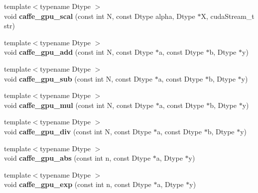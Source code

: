 \begin{DoxyCompactItemize}
\item 
{\footnotesize template$<$typename Dtype $>$ }\\void {\bfseries caffe\+\_\+gpu\+\_\+scal} (const int N, const Dtype alpha, Dtype $\ast$X, cuda\+Stream\+\_\+t str)\hypertarget{namespacecaffe_ace9fb7f8188d8f2bd58735c7617325ea}{}\label{namespacecaffe_ace9fb7f8188d8f2bd58735c7617325ea}

\item 
{\footnotesize template$<$typename Dtype $>$ }\\void {\bfseries caffe\+\_\+gpu\+\_\+add} (const int N, const Dtype $\ast$a, const Dtype $\ast$b, Dtype $\ast$y)\hypertarget{namespacecaffe_a0c7219c875e46b5f11e345f34209f369}{}\label{namespacecaffe_a0c7219c875e46b5f11e345f34209f369}

\item 
{\footnotesize template$<$typename Dtype $>$ }\\void {\bfseries caffe\+\_\+gpu\+\_\+sub} (const int N, const Dtype $\ast$a, const Dtype $\ast$b, Dtype $\ast$y)\hypertarget{namespacecaffe_a3f151ddcec1be108851341de83d31a1b}{}\label{namespacecaffe_a3f151ddcec1be108851341de83d31a1b}

\item 
{\footnotesize template$<$typename Dtype $>$ }\\void {\bfseries caffe\+\_\+gpu\+\_\+mul} (const int N, const Dtype $\ast$a, const Dtype $\ast$b, Dtype $\ast$y)\hypertarget{namespacecaffe_a37d5b94a9f52d0df1307c3137ced2126}{}\label{namespacecaffe_a37d5b94a9f52d0df1307c3137ced2126}

\item 
{\footnotesize template$<$typename Dtype $>$ }\\void {\bfseries caffe\+\_\+gpu\+\_\+div} (const int N, const Dtype $\ast$a, const Dtype $\ast$b, Dtype $\ast$y)\hypertarget{namespacecaffe_ad3bccae9d3b7d559f32a9911eb5474c6}{}\label{namespacecaffe_ad3bccae9d3b7d559f32a9911eb5474c6}

\item 
{\footnotesize template$<$typename Dtype $>$ }\\void {\bfseries caffe\+\_\+gpu\+\_\+abs} (const int n, const Dtype $\ast$a, Dtype $\ast$y)\hypertarget{namespacecaffe_a378c6320560d72b58b4332364d75fcdf}{}\label{namespacecaffe_a378c6320560d72b58b4332364d75fcdf}

\item 
{\footnotesize template$<$typename Dtype $>$ }\\void {\bfseries caffe\+\_\+gpu\+\_\+exp} (const int n, const Dtype $\ast$a, Dtype $\ast$y)\hypertarget{namespacecaffe_a377ac4c841146a13666afd9ad9411583}{}\label{namespacecaffe_a377ac4c841146a13666afd9ad9411583}


\end{DoxyCompactItemize}
